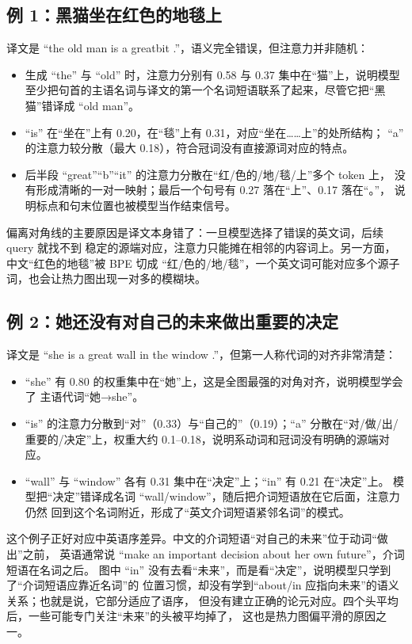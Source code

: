\documentclass[UTF8,a4paper,11pt]{ctexart}
\begin{document}
\subsection{例 1：黑猫坐在红色的地毯上}
译文是 “the old man is a greatbit .”，语义完全错误，但注意力并非随机：
\begin{itemize}
  \item 生成 “the” 与 “old” 时，注意力分别有 0.58 与 0.37 集中在“猫”上，说明模型
        至少把句首的主语名词与译文的第一个名词短语联系了起来，尽管它把“黑猫”错译成
        “old man”。
  \item “is” 在“坐在”上有 0.20，在“毯”上有 0.31，对应“坐在……上”的处所结构；
        “a” 的注意力较分散（最大 0.18），符合冠词没有直接源词对应的特点。
  \item 后半段 “great”“b”“it” 的注意力分散在“红/色的/地/毯/上”多个 token 上，
        没有形成清晰的一对一映射；最后一个句号有 0.27 落在“上”、0.17 落在“。”，
        说明标点和句末位置也被模型当作结束信号。
\end{itemize}
偏离对角线的主要原因是译文本身错了：一旦模型选择了错误的英文词，后续 query 就找不到
稳定的源端对应，注意力只能摊在相邻的内容词上。另一方面，中文“红色的地毯”被 BPE 切成
“红/色的/地/毯”，一个英文词可能对应多个源子词，也会让热力图出现一对多的模糊块。

\subsection{例 2：她还没有对自己的未来做出重要的决定}
译文是 “she is a great wall in the window .”，但第一人称代词的对齐非常清楚：
\begin{itemize}
  \item “she” 有 0.80 的权重集中在“她”上，这是全图最强的对角对齐，说明模型学会了
        主语代词“她→she”。
  \item “is” 的注意力分散到“对”（0.33）与“自己的”（0.19）；“a” 分散在“对/做/出/
        重要的/决定”上，权重大约 0.1--0.18，说明系动词和冠词没有明确的源端对应。
  \item “wall” 与 “window” 各有 0.31 集中在“决定”上；“in” 有 0.21 在“决定”上。
        模型把“决定”错译成名词 “wall/window”，随后把介词短语放在它后面，注意力仍然
        回到这个名词附近，形成了“英文介词短语紧邻名词”的模式。
\end{itemize}
这个例子正好对应中英语序差异。中文的介词短语“对自己的未来”位于动词“做出”之前，
英语通常说 “make an important decision about her own future”，介词短语在名词之后。
图中 “in” 没有去看“未来”，而是看“决定”，说明模型只学到了“介词短语应靠近名词”的
位置习惯，却没有学到“about/in 应指向未来”的语义关系；也就是说，它部分适应了语序，
但没有建立正确的论元对应。四个头平均后，一些可能专门关注“未来”的头被平均掉了，
这也是热力图偏平滑的原因之一。
\end{document}
